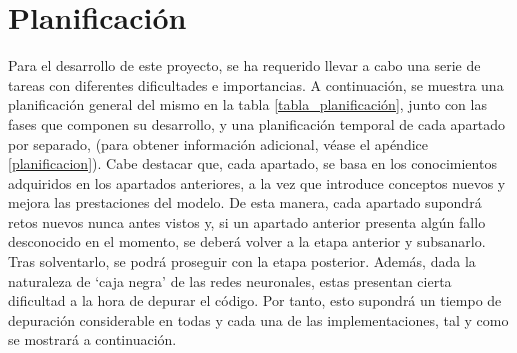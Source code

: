 \section{Planificación}

Para el desarrollo de este proyecto, se ha requerido llevar a cabo una serie de tareas con diferentes dificultades e importancias. A continuación, se muestra una planificación general del mismo en la tabla \ref{tabla_planificación}, junto con las fases que componen su desarrollo, y una planificación temporal de cada apartado por separado,  (para obtener información adicional, véase el apéndice \ref{planificacion}). Cabe destacar que, cada apartado, se basa en los conocimientos adquiridos en los apartados anteriores, a la vez que introduce conceptos nuevos y mejora las prestaciones del modelo. De esta manera, cada apartado supondrá retos nuevos nunca antes vistos y, si un apartado anterior presenta algún fallo desconocido en el momento, se deberá volver a la etapa anterior y subsanarlo. Tras solventarlo, se podrá proseguir con la etapa posterior. Además, dada la naturaleza de `caja negra' de las redes neuronales, estas presentan cierta dificultad a la hora de depurar el código. Por tanto, esto supondrá un tiempo de depuración considerable en todas y cada una de las implementaciones, tal y como se mostrará a continuación.

